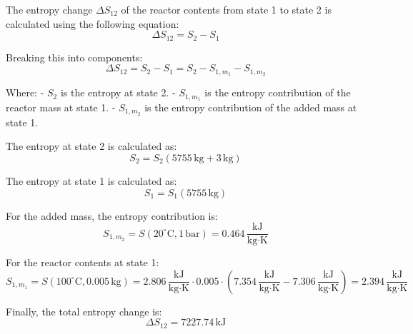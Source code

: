 The entropy change \( \Delta S_{12} \) of the reactor contents from state 1 to state 2 is calculated using the following equation:  
\[
\Delta S_{12} = S_2 - S_1
\]  

Breaking this into components:  
\[
\Delta S_{12} = S_2 - S_1 = S_2 - S_{1,m_1} - S_{1,m_2}
\]  

Where:  
- \( S_2 \) is the entropy at state 2.  
- \( S_{1,m_1} \) is the entropy contribution of the reactor mass at state 1.  
- \( S_{1,m_2} \) is the entropy contribution of the added mass at state 1.  

The entropy at state 2 is calculated as:  
\[
S_2 = S_2(5755 \, \text{kg} + 3 \, \text{kg})
\]  

The entropy at state 1 is calculated as:  
\[
S_1 = S_1(5755 \, \text{kg})
\]  

For the added mass, the entropy contribution is:  
\[
S_{1,m_2} = S(20^\circ\text{C}, 1 \, \text{bar}) = 0.464 \, \frac{\text{kJ}}{\text{kg·K}}
\]  

For the reactor contents at state 1:  
\[
S_{1,m_1} = S(100^\circ\text{C}, 0.005 \, \text{kg}) = 2.806 \, \frac{\text{kJ}}{\text{kg·K}} \cdot 0.005 \cdot \left(7.354 \, \frac{\text{kJ}}{\text{kg·K}} - 7.306 \, \frac{\text{kJ}}{\text{kg·K}}\right) = 2.394 \, \frac{\text{kJ}}{\text{kg·K}}
\]  

Finally, the total entropy change is:  
\[
\Delta S_{12} = 7227.74 \, \text{kJ}
\]